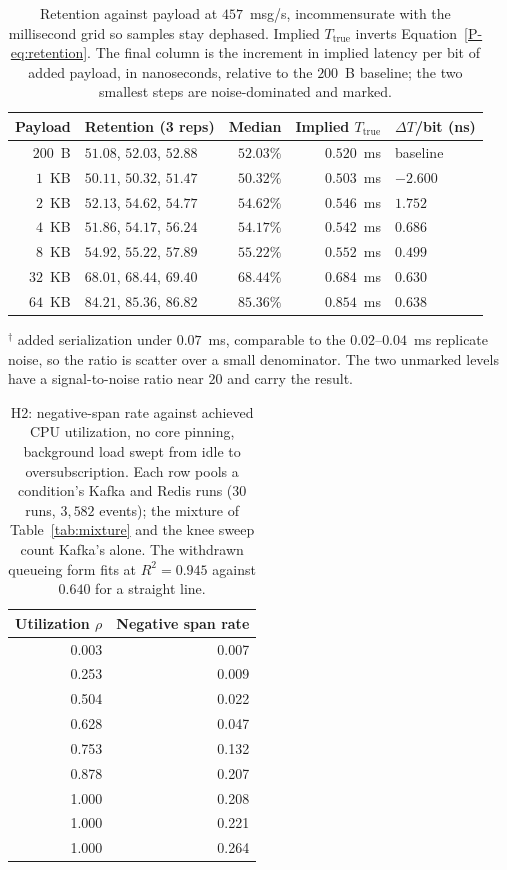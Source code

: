 \documentclass[10pt,journal,onecolumn]{IEEEtran}
\newcommand{\kafka}{Kafka}
\newcommand{\redis}{Redis}
\begin{document}
\begin{table}[t]
\caption{Retention against payload at $457$~msg/s, incommensurate with the millisecond grid so
samples stay dephased. Implied $T_{\mathrm{true}}$ inverts Equation~\ref{P-eq:retention}. The final
column is the increment in implied latency per bit of added payload, in nanoseconds, relative to
the $200$~B baseline; the two smallest steps are noise-dominated and marked.}
\label{tab:payload}
\small
\begin{tabular}{@{}rlrrl@{}}
\toprule
Payload & Retention (3 reps) & Median & Implied $T_{\mathrm{true}}$ & $\Delta T$/bit (ns) \\
\midrule
$200$~B & $51.08$, $52.03$, $52.88$ & $52.03\%$ & $0.520$~ms & baseline \\
$1$~KB & $50.11$, $50.32$, $51.47$ & $50.32\%$ & $0.503$~ms & $-2.600$\rlap{$^\dagger$} \\
$2$~KB & $52.13$, $54.62$, $54.77$ & $54.62\%$ & $0.546$~ms & $1.752$\rlap{$^\dagger$} \\
$4$~KB & $51.86$, $54.17$, $56.24$ & $54.17\%$ & $0.542$~ms & $0.686$\rlap{$^\dagger$} \\
$8$~KB & $54.92$, $55.22$, $57.89$ & $55.22\%$ & $0.552$~ms & $0.499$\rlap{$^\dagger$} \\
$32$~KB & $68.01$, $68.44$, $69.40$ & $68.44\%$ & $0.684$~ms & $\mathbf{0.630}$ \\
$64$~KB & $84.21$, $85.36$, $86.82$ & $85.36\%$ & $0.854$~ms & $\mathbf{0.638}$ \\
\bottomrule
\end{tabular}

\smallskip
{\footnotesize $^\dagger$ added serialization under $0.07$~ms, comparable to the $0.02$--$0.04$~ms
replicate noise, so the ratio is scatter over a small denominator. The two unmarked levels have a
signal-to-noise ratio near $20$ and carry the result.}
\end{table}


\begin{table}[t]
\caption{H2: negative-span rate against achieved CPU utilization, no core pinning, background load
swept from idle to oversubscription. Each row pools a condition's \kafka{} and \redis{} runs
($30$ runs, $3{,}582$ events); the mixture of Table~\ref{tab:mixture} and the knee sweep count
\kafka{}'s alone. The withdrawn queueing form fits at $R^2 = 0.945$ against $0.640$ for a
straight line.}
\label{tab:h2load}
\begin{tabular}{rr}
\toprule
Utilization $\rho$ & Negative span rate \\
\midrule
0.003 & 0.007 \\
0.253 & 0.009 \\
0.504 & 0.022 \\
0.628 & 0.047 \\
0.753 & 0.132 \\
0.878 & 0.207 \\
1.000 & 0.208 \\
1.000 & 0.221 \\
1.000 & 0.264 \\
\bottomrule
\end{tabular}
\end{table}
\end{document}

